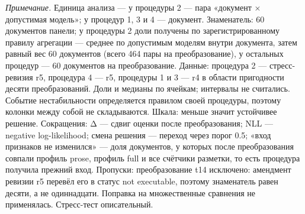 \begin{table}[htbp]
\begin{minipage}{\linewidth}
\textit{Примечание.} Единица анализа — у процедуры 2 — пара «документ × допустимая модель»; у процедур 1, 3 и 4 — документ. Знаменатель: 60 документов панели; у процедуры 2 доли получены по зарегистрированному правилу агрегации — среднее по допустимым моделям внутри документа, затем равный вес 60 документов (всего 464 пары на преобразование), у остальных процедур — 60 документов на преобразование. Данные: процедура 2 — стресс-ревизия r5, процедура 4 — r5, процедуры 1 и 3 — r4 в области пригодности десяти преобразований. Доли и медианы по ячейкам; интервалы не считались. Событие нестабильности определяется правилом своей процедуры, поэтому колонки между собой не складываются. Шкала: меньше значит устойчивее решение. Сокращения: Δ — сдвиг оценки после преобразования; NLL — negative log-likelihood; смена решения — переход через порог 0.5; «вход признаков не изменился» — доля документов, у которых после преобразования совпали профиль prose, профиль full и все счётчики разметки, то есть процедура получила прежний вход. Пропуски: преобразование t14 исключено: амендмент ревизии r5 перевёл его в статус not executable, поэтому знаменатель равен десяти, а не одиннадцати. Поправка на множественные сравнения не применялась. Стресс-тест описательный.
\end{minipage}
\end{table}
